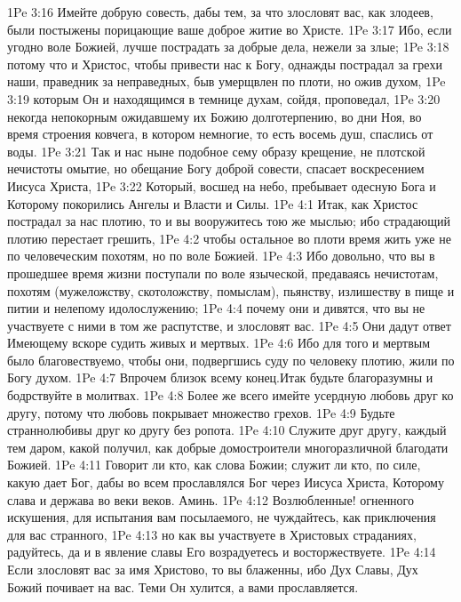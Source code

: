 \vs 1Pe 3:16 Имейте добрую совесть, дабы тем, за что злословят вас, как злодеев, были постыжены порицающие ваше доброе житие во Христе.
\vs 1Pe 3:17 Ибо, если угодно воле Божией, лучше пострадать за добрые дела, нежели за злые;
\vs 1Pe 3:18 потому что и Христос, чтобы привести нас к Богу, однажды пострадал за грехи наши, праведник за неправедных, быв умерщвлен по плоти, но ожив духом,
\vs 1Pe 3:19 которым Он и находящимся в темнице духам, сойдя, проповедал,
\vs 1Pe 3:20 некогда непокорным ожидавшему их Божию долготерпению, во дни Ноя, во время строения ковчега, в котором немногие, то есть восемь душ, спаслись от воды.
\vs 1Pe 3:21 Так и нас ныне подобное сему образу крещение, не плотской нечистоты омытие, но обещание Богу доброй совести, спасает воскресением Иисуса Христа,
\vs 1Pe 3:22 Который, восшед на небо, пребывает одесную Бога и Которому покорились Ангелы и Власти и Силы.
\vs 1Pe 4:1 Итак, как Христос пострадал за нас плотию, то и вы вооружитесь тою же мыслью; ибо страдающий плотию перестает грешить,
\vs 1Pe 4:2 чтобы остальное во плоти время жить уже не по человеческим похотям, но по воле Божией.
\vs 1Pe 4:3 Ибо довольно, что вы в прошедшее время жизни поступали по воле языческой, предаваясь нечистотам, похотям (мужеложству, скотоложству, помыслам), пьянству, излишеству в пище и питии и нелепому идолослужению;
\vs 1Pe 4:4 почему они и дивятся, что вы не участвуете с ними в том же распутстве, и злословят вас.
\vs 1Pe 4:5 Они дадут ответ Имеющему вскоре судить живых и мертвых.
\vs 1Pe 4:6 Ибо для того и мертвым было благовествуемо, чтобы они, подвергшись суду по человеку плотию, жили по Богу духом.
\vs 1Pe 4:7 Впрочем близок всему конец.\rsbpar Итак будьте благоразумны и бодрствуйте в молитвах.
\vs 1Pe 4:8 Более же всего имейте усердную любовь друг ко другу, потому что любовь покрывает множество грехов.
\vs 1Pe 4:9 Будьте страннолюбивы друг ко другу без ропота.
\vs 1Pe 4:10 Служите друг другу, каждый тем даром, какой получил, как добрые домостроители многоразличной благодати Божией.
\vs 1Pe 4:11 Говорит ли кто,  как слова Божии; служит ли кто,  по силе, какую дает Бог, дабы во всем прославлялся Бог через Иисуса Христа, Которому слава и держава во веки веков. Аминь.
\rsbpar\vs 1Pe 4:12 Возлюбленные! огненного искушения, для испытания вам посылаемого, не чуждайтесь, как приключения для вас странного,
\vs 1Pe 4:13 но как вы участвуете в Христовых страданиях, радуйтесь, да и в явление славы Его возрадуетесь и восторжествуете.
\vs 1Pe 4:14 Если злословят вас за имя Христово, то вы блаженны, ибо Дух Славы, Дух Божий почивает на вас. Теми Он хулится, а вами прославляется.
